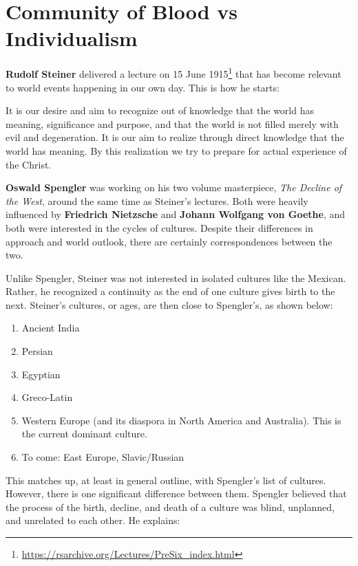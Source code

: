 \section{Community of Blood vs Individualism}

\textbf{Rudolf Steiner} delivered a lecture on 15 June 1915\footnote{\url{https://rsarchive.org/Lectures/PreSix_index.html}} that has become relevant to world events happening in our own day. This is how he starts:

\begin{quotex}
It is our desire and aim to recognize out of knowledge that the world has meaning, significance and purpose, and that the world is not filled merely with evil and degeneration. It is our aim to realize through direct knowledge that the world has meaning. By this realization we try to prepare for actual experience of the Christ.
\end{quotex}


\textbf{Oswald Spengler} was working on his two volume masterpiece, \emph{The Decline of the West}, around the same time as Steiner's lectures. Both were heavily influenced by \textbf{Friedrich Nietzsche} and \textbf{Johann Wolfgang von Goethe}, and both were interested in the cycles of cultures. Despite their differences in approach and world outlook, there are certainly correspondences between the two.

Unlike Spengler, Steiner was not interested in isolated cultures like the Mexican. Rather, he recognized a continuity as the end of one culture gives birth to the next. Steiner's cultures, or ages, are then close to Spengler's, as shown below:

\begin{enumerate}


\item Ancient India

\item Persian

\item Egyptian

\item Greco-Latin

\item Western Europe (and its diaspora in North America and Australia). This is the current dominant culture.

\item To come: East Europe, Slavic/Russian
\end{enumerate}


This matches up, at least in general outline, with Spengler's list of cultures. However, there is one significant difference between them. Spengler believed that the process of the birth, decline, and death of a culture was blind, unplanned, and unrelated to each other. He explains:

